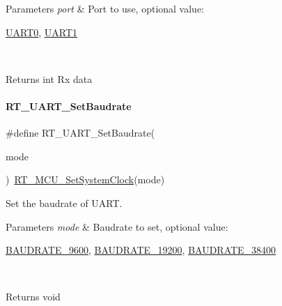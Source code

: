 \begin{DoxyParams}{Parameters}
{\em port} & Port to use, optional value\+:
\begin{DoxyCode}
\mbox{\hyperlink{a00098_a0508661f121639ffdee7de2353a0def2}{UART0}}, \mbox{\hyperlink{a00098_a8d69bf04d07af4fbbab5a8bd291f65ff}{UART1}}
\end{DoxyCode}
 \\
\hline
\end{DoxyParams}
\begin{DoxyReturn}{Returns}
int Rx data 
\end{DoxyReturn}
\mbox{\label{a00098_a565befb27caf782083358e0ad81af3a3}} 
\paragraph{\texorpdfstring{R\+T\+\_\+\+U\+A\+R\+T\+\_\+\+Set\+Baudrate}{RT\_UART\_SetBaudrate}}
{\footnotesize\ttfamily \#define R\+T\+\_\+\+U\+A\+R\+T\+\_\+\+Set\+Baudrate(\begin{DoxyParamCaption}\item[{}]{mode }\end{DoxyParamCaption})~\mbox{\hyperlink{a00026_a017f8665ec51267680fc0e536db19c13}{R\+T\+\_\+\+M\+C\+U\+\_\+\+Set\+System\+Clock}}(mode)}



Set the baudrate of U\+A\+RT. 


\begin{DoxyParams}{Parameters}
{\em mode} & Baudrate to set, optional value\+:
\begin{DoxyCode}
\mbox{\hyperlink{a00098_a89d72bee69b33d0404d33f47608d16f0}{BAUDRATE\_9600}}, \mbox{\hyperlink{a00098_ab94a89ecf1976f304764aec119e215e7}{BAUDRATE\_19200}}, \mbox{\hyperlink{a00098_a9c74d2185a532185624b8dc3086f8e3e}{BAUDRATE\_38400}}
\end{DoxyCode}
 \\
\hline
\end{DoxyParams}
\begin{DoxyReturn}{Returns}
void 
\end{DoxyReturn}
\mbox{\label{a00098_a432520c6f67a10918aa07884250a7cbc}} 
